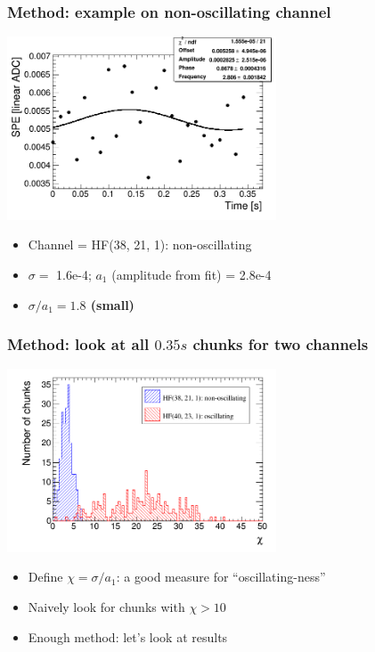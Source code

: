 \documentclass[bigger]{beamer}
\providecommand{\alert}[1]{\textbf{#1}}
\begin{document}
\begin{frame}
\frametitle{Method: example on non-oscillating channel}
\label{sec-2-1-8}
\label{sec-2-1-8-1}

\centering
\includegraphics[width=0.6\textwidth]{fig/fit_output_ieta38_iphi21_depth1.png}
\begin{itemize}

\item Channel = HF(38, 21, 1): non-oscillating
\label{sec-2-1-8-2}%

\item $\sigma =$ 1.6e-4; $a_{1}$ (amplitude from fit) = 2.8e-4
\label{sec-2-1-8-3}%

\item \alert{$\sigma / a_{1} = 1.8$ (small)}
\label{sec-2-1-8-4}%
\end{itemize} %
\end{frame}
\begin{frame}
\frametitle{Method: look at all $0.35 s$ chunks for two channels}
\label{sec-2-1-9}
\label{sec-2-1-9-1}

\centering
\includegraphics[width=0.6\textwidth]{fig/amp_over_signif_comparison.png}
\begin{itemize}

\item Define \alert{$\chi = \sigma / a_{1}$}: a good measure for ``oscillating-ness''
\label{sec-2-1-9-2}%

\item Naively look for chunks with $\chi > 10$
\label{sec-2-1-9-3}%

\item Enough method: let's look at results
\label{sec-2-1-9-4}%
\end{itemize} %
\end{frame}
\end{document}
